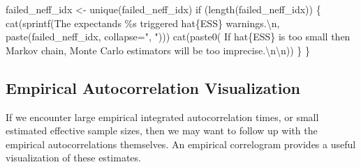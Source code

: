 \documentclass[
  letterpaper,
  DIV=11,
  numbers=noendperiod]{scrartcl}
\newenvironment{Shaded}{\begin{snugshade}}{\end{snugshade}}
\newcommand{\AttributeTok}[1]{\textcolor[rgb]{0.40,0.45,0.13}{#1}}
\newcommand{\ControlFlowTok}[1]{\textcolor[rgb]{0.00,0.23,0.31}{#1}}
\newcommand{\FunctionTok}[1]{\textcolor[rgb]{0.28,0.35,0.67}{#1}}
\newcommand{\NormalTok}[1]{\textcolor[rgb]{0.00,0.23,0.31}{#1}}
\newcommand{\OtherTok}[1]{\textcolor[rgb]{0.00,0.23,0.31}{#1}}
\newcommand{\SpecialCharTok}[1]{\textcolor[rgb]{0.37,0.37,0.37}{#1}}
\newcommand{\StringTok}[1]{\textcolor[rgb]{0.13,0.47,0.30}{#1}}
\begin{document}
\begin{Shaded}
\begin{Highlighting}[]
\NormalTok{  failed\_neff\_idx }\OtherTok{\textless{}{-}} \FunctionTok{unique}\NormalTok{(failed\_neff\_idx)}
  \ControlFlowTok{if}\NormalTok{ (}\FunctionTok{length}\NormalTok{(failed\_neff\_idx)) \{}
    \FunctionTok{cat}\NormalTok{(}\FunctionTok{sprintf}\NormalTok{(}\StringTok{\textquotesingle{}The expectands \%s triggered hat\{ESS\} warnings.}\SpecialCharTok{\textbackslash{}n}\StringTok{\textquotesingle{}}\NormalTok{,}
                \FunctionTok{paste}\NormalTok{(failed\_neff\_idx, }\AttributeTok{collapse=}\StringTok{", "}\NormalTok{)))}
    \FunctionTok{cat}\NormalTok{(}\FunctionTok{paste0}\NormalTok{(}\StringTok{\textquotesingle{}  If hat\{ESS\} is too small then Markov chain\textquotesingle{}}\NormalTok{,}
               \StringTok{\textquotesingle{} Monte Carlo estimators will be too imprecise.}\SpecialCharTok{\textbackslash{}n\textbackslash{}n}\StringTok{\textquotesingle{}}\NormalTok{))}
\NormalTok{  \}}
\NormalTok{\}}
\end{Highlighting}
\end{Shaded}

\hypertarget{empirical-autocorrelation-visualization}{%
\subsection{Empirical Autocorrelation
Visualization}\label{empirical-autocorrelation-visualization}}

If we encounter large empirical integrated autocorrelation times, or
small estimated effective sample sizes, then we may want to follow up
with the empirical autocorrelations themselves. An empirical correlogram
provides a useful visualization of these estimates.
\end{document}
